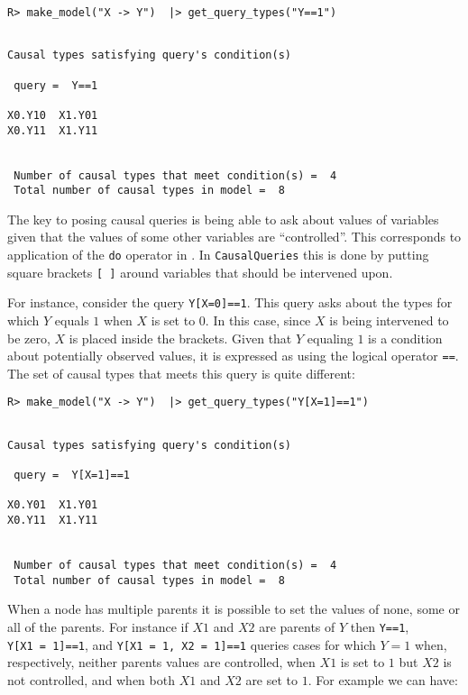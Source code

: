 \documentclass[
  11pt,
  article]{jss}
\begin{document}
\begin{verbatim}
R> make_model("X -> Y")  |> get_query_types("Y==1")
\end{verbatim}

\begin{verbatim}

Causal types satisfying query's condition(s)  

 query =  Y==1 

X0.Y10  X1.Y01
X0.Y11  X1.Y11


 Number of causal types that meet condition(s) =  4
 Total number of causal types in model =  8
\end{verbatim}

The key to posing causal queries is being able to ask about values of
variables given that the values of some other variables are
``controlled''. This corresponds to application of the \texttt{do}
operator in \citet{pearl_causality_2009}. In \texttt{CausalQueries} this
is done by putting square brackets \texttt{{[}\ {]}} around variables
that should be intervened upon.

For instance, consider the query \texttt{Y{[}X=0{]}==1}. This query asks
about the types for which \(Y\) equals \(1\) when \(X\) is set to \(0\).
In this case, since \(X\) is being intervened to be zero, \(X\) is
placed inside the brackets. Given that \(Y\) equaling \(1\) is a
condition about potentially observed values, it is expressed as using
the logical operator \texttt{==}. The set of causal types that meets
this query is quite different:

\begin{verbatim}
R> make_model("X -> Y")  |> get_query_types("Y[X=1]==1")
\end{verbatim}

\begin{verbatim}

Causal types satisfying query's condition(s)  

 query =  Y[X=1]==1 

X0.Y01  X1.Y01
X0.Y11  X1.Y11


 Number of causal types that meet condition(s) =  4
 Total number of causal types in model =  8
\end{verbatim}

When a node has multiple parents it is possible to set the values of
none, some or all of the parents. For instance if \(X1\) and \(X2\) are
parents of \(Y\) then \texttt{Y==1}, \texttt{Y{[}X1\ =\ 1{]}==1}, and
\texttt{Y{[}X1\ =\ 1,\ X2\ =\ 1{]}==1} queries cases for which \(Y=1\)
when, respectively, neither parents values are controlled, when \(X1\)
is set to \(1\) but \(X2\) is not controlled, and when both \(X1\) and
\(X2\) are set to \(1\). For example we can have:
\end{document}
